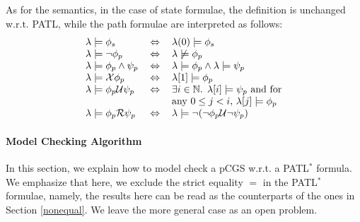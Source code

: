 \documentclass[times, 10 pt,twocolumn]{article}
\newcommand{\mb}[1]{\mathbb{#1}}
\newcommand{\mc}[1]{\mathcal{#1}}
\begin{document}
As for the semantics, in the case of state formulae, the
definition is unchanged w.r.t. PATL, while the path formulae are
interpreted as follows:
\[
\begin{tabular}{lll}
 $\lambda \models \phi_s$ & $\Leftrightarrow$   &
 $\lambda(0) \models \phi_s$\\

 $\lambda \models \neg\phi_p$ & $\Leftrightarrow$   &
 $\lambda \not\models \phi_p$\\

 $\lambda \models \phi_p \wedge \psi_p$ & $\Leftrightarrow$   &
 $\lambda \models \phi_p \wedge \lambda \models \psi_p$\\

 $\lambda \models \mc{X}\phi_p$ & $\Leftrightarrow$   &
 $\lambda[1]\models \phi_p$\\

 $\lambda \models \phi_p\mc{U}\psi_p$ & $\Leftrightarrow$   &
 $\exists i\in \mb{N}$. $\lambda[i]\models \psi_p$ and for \\ & & any $0\leq j<i$, $\lambda[j]\models
 \phi_p$\\

 $\lambda \models \phi_p\mc{R}\psi_p$ & $\Leftrightarrow$   &
 $\lambda \models \neg (\neg \phi_p\mc{U} \neg \psi_p)$\\
\end{tabular}
\]
%
\paragraph{Model Checking Algorithm} %
In this section, we explain how to model check a pCGS %
w.r.t. a PATL$^*$ formula. We emphasize that here, we exclude the
strict equality $=$ in the PATL$^*$ formulae, namely, the results
here can be read as the counterparts of the ones in Section
\ref{nonequal}. We leave the more general case as an open problem.
\end{document}
